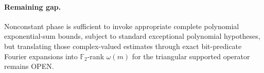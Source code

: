 \documentclass[11pt]{article}\usepackage[margin=.88in]{geometry}\usepackage{amsmath,amssymb}
\begin{document}
\paragraph{Remaining gap.}
Nonconstant phase is sufficient to invoke appropriate complete polynomial exponential-sum bounds, subject to standard exceptional polynomial hypotheses, but translating those complex-valued estimates through exact bit-predicate Fourier expansions into \(\mathbb F_2\)-rank \(\omega(m)\) for the triangular supported operator remains OPEN.
\end{document}
